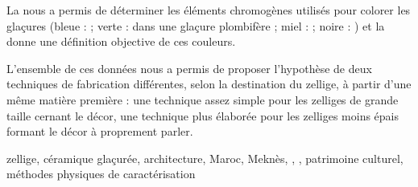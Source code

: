 {La \SAO nous a permis de déterminer les éléments chromogènes utilisés 
pour colorer les glaçures (bleue :  ; verte :  
dans une glaçure plombifère ; miel :  ; noire : ) 
et la \CHRO donne une définition objective de ces couleurs.

L'ensemble de ces données nous a permis de proposer l'hypothèse de 
deux techniques de fabrication différentes, selon la destination du 
zellige, à partir d'une même matière première : une technique assez 
simple pour les zelliges de grande taille cernant le décor, une 
technique plus élaborée pour les zelliges moins épais formant le 
décor à proprement parler.

\vfill

\begin{motsclef}
   zellige, céramique glaçurée, architecture, Maroc, Meknès, 
   \PaM, , patrimoine culturel, méthodes physiques 
   de caractérisation
\end{motsclef}
}
